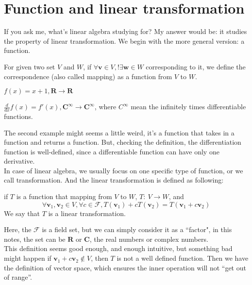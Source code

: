 \newcommand{\x}{\mathbf{x}}
\renewcommand{\v}{\mathbf{v}}
\newcommand{\w}{\mathbf{w}}

\section{Function and linear transformation}

If you ask me, what's linear algebra studying for? My answer would be: it studies the property of linear transformation. We begin with the more general version: a function.

\begin{definition}
    For given two set $V$ and $W$, if 
    $\forall \mathbf{v} \in V, ! \exists \mathbf{w} \in W$ corresponding to it, we define the correspondence (also called mapping) as a function from $V$ to $W$.
\end{definition}

\begin{eg}
    $f(x) = x+1, \mathbf{R} \to \mathbf{R}$\\
\end{eg}
\begin{eg}
    $\frac{d}{dx} f(x) = f'(x), \mathbf{C^{\infty}} \to \mathbf{C^{\infty}}$, where $C^{\infty}$ mean the infinitely times differentiable functions.\\
\end{eg}

The second example might seems a little weird, it's a function that takes in a function and returns a function. But, checking the definition, the differentiation function is well-defined, since a differentiable function can have only one derivative.\\

In case of linear algebra, we usually focus on one specific type of function, or we call transformation. And the linear transformation is defined as following:
\begin{definition}
    if $T$ is a function that mapping from $V$ to $W$,
    $T:\ V \to W$, and $$\forall \v_1,\v_2 \in V, \forall c \in \mathcal{F}, T(\v_1)+cT(\v_2) = T(\v_1+c\v_2)$$
    We say that $T$ is a linear transformation.
\end{definition}
Here, the $\mathcal{F}$ is a field set, but we can simply consider it as a ``factor", in this notes, the set can be $\mathbf{R}$ or $\mathbf{C}$, the real numbers or complex numbers.\\

This definition seems good enough, and enough intuitive, but something bad might happen if $\v_1+c\v_2 \notin V$, then $T$ is not a well defined function. Then we have the definition of vector space, which ensures the inner operation will not ``get out of range''. 

